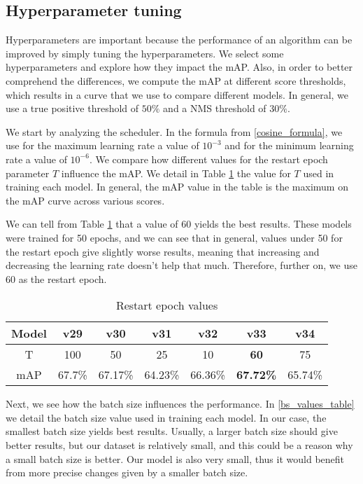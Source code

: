 \subsection{Hyperparameter tuning}
    Hyperparameters are important because the performance of an algorithm can be improved by simply tuning the hyperparameters. We select some hyperparameters and explore how they impact the mAP. Also, in order to better comprehend the differences, we compute the mAP at different score thresholds, which results in a curve that we use to compare different models. In general, we use a true positive threshold of $50\%$ and a NMS threshold of $30\%$.
    
    We start by analyzing the scheduler. In the formula from \ref{cosine_formula}, we use for the maximum learning rate a value of $10^{-3}$ and for the minimum learning rate a value of $10^{-6}$. We compare how different values for the restart epoch parameter $T$ influence the mAP. We detail in Table \ref{t_values_table} the value for $T$ used in training each model. In general, the mAP value in the table is the maximum on the mAP curve across various scores.

We can tell from Table \ref{t_values_table} that a value of 60 yields the best results. These models were trained for 50 epochs, and we can see that in general, values under 50 for the restart epoch give slightly worse results, meaning that increasing and decreasing the learning rate doesn't help that much. Therefore, further on, we use 60 as the restart epoch.


    \begin{table}[H]
    \centering
    \caption{Restart epoch values}
    \begin{tabular}{c|cccccc}
    Model & v29    & v30     & v31     & v32     & \textbf{v33}     & v34     \\ \hline
    T     & 100    & 50      & 25      & 10      & \textbf{60}      & 75      \\ \hline
    mAP   & 67.7\% & 67.17\% & 64.23\% & 66.36\% & \textbf{67.72\%} & 65.74\%
    \end{tabular}
    \label{t_values_table}
    \end{table}

    Next, we see how the batch size influences the performance. In \ref{bs_values_table} we detail the batch size value used in training each model. In our case, the smallest batch size yields best results. Usually, a larger batch size should give better results, but our dataset is relatively small, and this could be a reason why a small batch size is better. Our model is also very small, thus it would benefit from more precise changes given by a smaller batch size.

